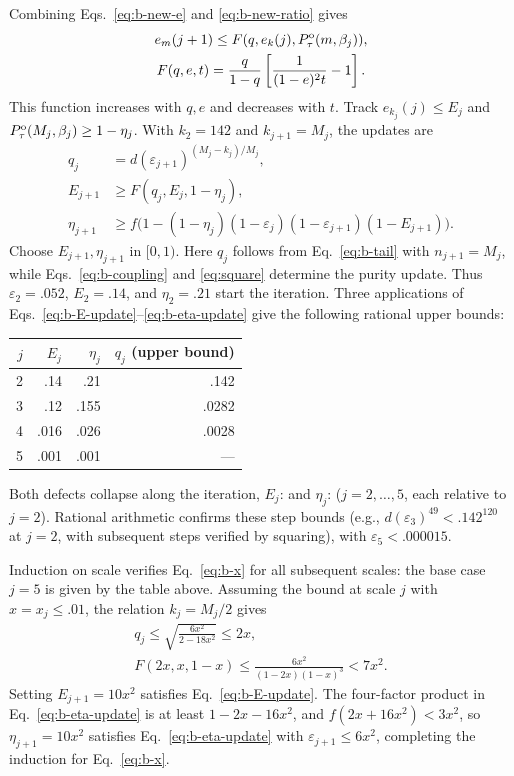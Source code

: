 \documentclass[aps,prl,reprint,amsmath,amssymb,nofootinbib,raggedbottom]{revtex4-2}
\begin{document}
Combining Eqs.~\eqref{eq:b-new-e} and \eqref{eq:b-new-ratio} gives
\begin{equation}
 \begin{gathered}
 e_m(j+1)\le F(q,e_k(j),P_{\tau}^{\mathrm{o}}(m,\beta_j)),\\
 F(q,e,t)=\frac{q}{1-q}\left[\frac1{(1-e)^2t}-1\right].
 \end{gathered}
 \label{eq:b-F}
\end{equation}
This function increases with $q,e$ and decreases with $t$.
Track $e_{k_j}(j)\le E_j$ and $P_{\tau}^{\mathrm{o}}(M_j,\beta_j)\ge1-\eta_j$.
With $k_2=142$ and $k_{j+1}=M_j$, the updates are
\begin{align}
 q_j&=d(\varepsilon_{j+1})^{(M_j-k_j)/M_j},\label{eq:b-q}\\
 E_{j+1}&\ge F(q_j,E_j,1-\eta_j),\label{eq:b-E-update}\\
 \eta_{j+1}&\ge f\bigl(1-(1-\eta_j)(1-\varepsilon_j)
                   (1-\varepsilon_{j+1})(1-E_{j+1})\bigr).
 \label{eq:b-eta-update}
\end{align}
Choose $E_{j+1},\eta_{j+1}$ in $[0,1)$.
Here $q_j$ follows from Eq.~\eqref{eq:b-tail} with $n_{j+1}=M_j$, while Eqs.~\eqref{eq:b-coupling} and \eqref{eq:square} determine the purity update.
Thus $\varepsilon_2=.052$, $E_2=.14$, and $\eta_2=.21$ start the iteration.
Three applications of Eqs.~\eqref{eq:b-E-update}--\eqref{eq:b-eta-update}
give the following rational upper bounds:
\begin{center}
\begin{tabular}{@{}rrrr@{}}
\toprule
$j$ & $E_j$ & $\eta_j$ & $q_j$ (upper bound)\\
\midrule
2 & .14 & .21 & .142\\
3 & .12 & .155 & .0282\\
4 & .016 & .026 & .0028\\
5 & .001 & .001 & ---\\
\bottomrule
\end{tabular}
\end{center}
Both defects collapse along the iteration, $E_j$:
 and $\eta_j$: 
($j=2,\dots,5$, each relative to $j=2$).
Rational arithmetic confirms these step bounds (e.g., $d(\varepsilon_3)^{49}<.142^{120}$ at $j=2$, with subsequent steps verified by squaring), with $\varepsilon_5<.000015$.


Induction on scale verifies Eq.~\eqref{eq:b-x} for all subsequent scales: the base case $j=5$ is given by the table above.
Assuming the bound at scale $j$ with $x=x_j\le.01$, the relation $k_j=M_j/2$ gives
\begin{equation}
 \begin{gathered}
 q_j\le\sqrt{\frac{6x^2}{2-18x^2}}\le2x,\\
 F(2x,x,1-x)\le\frac{6x^2}{(1-2x)(1-x)^3}<7x^2.
 \end{gathered}
 \label{eq:b-x-e}
\end{equation}
Setting $E_{j+1}=10x^2$ satisfies Eq.~\eqref{eq:b-E-update}.
The four-factor product in Eq.~\eqref{eq:b-eta-update} is at least $1-2x-16x^2$, and $f(2x+16x^2)<3x^2$, so $\eta_{j+1}=10x^2$ satisfies Eq.~\eqref{eq:b-eta-update} with $\varepsilon_{j+1}\le6x^2$, completing the induction for Eq.~\eqref{eq:b-x}.
\end{document}

